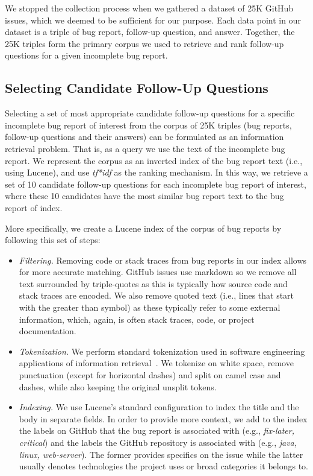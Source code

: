 
 We stopped the collection process when we gathered a dataset of 25K GitHub issues, which we deemed to be sufficient for our purpose. Each data point in our dataset is a triple of
bug report, follow-up question, and answer. Together, the 25K triples form the primary corpus we used to
retrieve and rank follow-up questions for a given incomplete bug report.


\subsection{Selecting Candidate Follow-Up Questions}

Selecting a set of most appropriate candidate follow-up questions for a specific incomplete bug report of interest from the corpus
of 25K triples (bug reports, follow-up questions and their answers) can be formulated as an information retrieval
problem. That is, as a query we use the text of the incomplete bug report. We represent the corpus
as an inverted index of the bug report text (i.e., using Lucene), and use {\em tf*idf} as the
ranking mechanism. In this way, we retrieve a set of 10 candidate follow-up questions for each incomplete bug report
of interest, where these 10 candidates have the most similar bug report text to the bug report of index.

More specifically, we create a Lucene index of the corpus of bug reports by following this set of steps:
\begin{itemize}
\item {\em Filtering.} Removing code or stack traces from bug reports in our index allows
for more accurate matching. GitHub issues use markdown so we remove all text surrounded
by triple-quotes as this is typically how source code and stack traces are encoded. We also
remove quoted text (i.e., lines that start with the greater than symbol) as these typically
refer to some external information, which, again, is often stack traces, code, or project documentation.
\item {\em Tokenization.} We perform standard tokenization used in software engineering applications
of information retrieval~\cite{marcus2004information,shepherd2012sando}. We tokenize on white space, remove
punctuation (except for horizontal dashes)
and split on camel case and dashes, while also keeping the original unsplit tokens.
\item {\em Indexing.} We use Lucene's standard configuration to index the title and the body in separate fields. In order to provide
more context, we add to the index the labels on GitHub that the bug report is associated with (e.g., {\em fix-later, critical}) and the labels the
GitHub repository is associated with (e.g., {\em java, linux, web-server}). The former provides specifics on the issue while the
latter usually denotes technologies the project uses or broad categories it belongs to.
\end{itemize}

